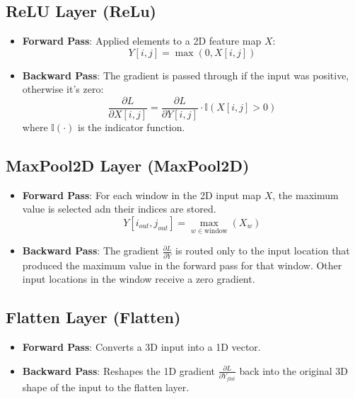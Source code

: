 \documentclass[conference]{IEEEtran}
\begin{document}
\subsection{ReLU Layer (ReLu)}
\begin{itemize}
    \item \textbf{Forward Pass}: Applied elements to a 2D feature map $X$:
    \[ Y[i,j] = \max(0, X[i,j]) \]
    \item \textbf{Backward Pass}: The gradient is passed through if the input was positive, otherwise it's zero:
    \[ \frac{\partial L}{\partial X[i,j]} = \frac{\partial L}{\partial Y[i,j]} \cdot \mathbb{I}(X[i,j] > 0) \]
    where $\mathbb{I}(\cdot)$ is the indicator function.
\end{itemize}

\subsection{MaxPool2D Layer (MaxPool2D)}
\begin{itemize}
    \item \textbf{Forward Pass}: For each window in the 2D input map $X$, the maximum value is selected adn their indices are stored.
    \[ Y[i_{out},j_{out}] = \max_{w \in \text{window}}(X_w) \]
    \item \textbf{Backward Pass}: The gradient $\frac{\partial L}{\partial Y}$ is routed only to the input location that produced the maximum value in the forward pass for that window. Other input locations in the window receive a zero gradient.
\end{itemize}

\subsection{Flatten Layer (Flatten)}
\begin{itemize}
    \item \textbf{Forward Pass}: Converts a 3D input into a 1D vector.
    \item \textbf{Backward Pass}: Reshapes the 1D gradient $\frac{\partial L}{\partial Y_{flat}}$ back into the original 3D shape of the input to the flatten layer.
\end{itemize}
\end{document}
